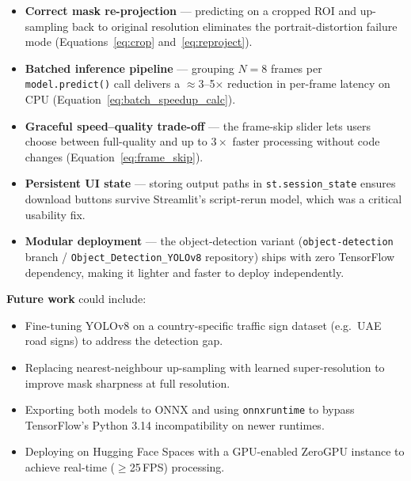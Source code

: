 \documentclass[12pt, a4paper]{article}
\begin{document}
\begin{itemize}[noitemsep]
  \item \textbf{Correct mask re-projection} — predicting on a cropped ROI
        and up-sampling back to original resolution eliminates the
        portrait-distortion failure mode (Equations~\ref{eq:crop}
        and~\ref{eq:reproject}).

  \item \textbf{Batched inference pipeline} — grouping $N=8$ frames per
        \texttt{model.predict()} call delivers a $\approx$3--5$\times$
        reduction in per-frame latency on CPU
        (Equation~\ref{eq:batch_speedup_calc}).

  \item \textbf{Graceful speed--quality trade-off} — the frame-skip slider
        lets users choose between full-quality and up to $3\times$ faster
        processing without code changes (Equation~\ref{eq:frame_skip}).

  \item \textbf{Persistent UI state} — storing output paths in
        \texttt{st.session\_state} ensures download buttons survive
        Streamlit's script-rerun model, which was a critical usability fix.

  \item \textbf{Modular deployment} — the object-detection variant
        (\texttt{object-detection} branch / \texttt{Object\_Detection\_YOLOv8}
        repository) ships with zero TensorFlow dependency, making it
        lighter and faster to deploy independently.
\end{itemize}

\noindent\textbf{Future work} could include:
\begin{itemize}[noitemsep]
  \item Fine-tuning YOLOv8 on a country-specific traffic sign dataset
        (e.g.\ UAE road signs) to address the detection gap.
  \item Replacing nearest-neighbour up-sampling with learned super-resolution
        to improve mask sharpness at full resolution.
  \item Exporting both models to ONNX and using \texttt{onnxruntime} to
        bypass TensorFlow's Python 3.14 incompatibility on newer runtimes.
  \item Deploying on Hugging Face Spaces with a GPU-enabled ZeroGPU instance
        to achieve real-time ($\geq$25\,FPS) processing.
\end{itemize}
\end{document}
